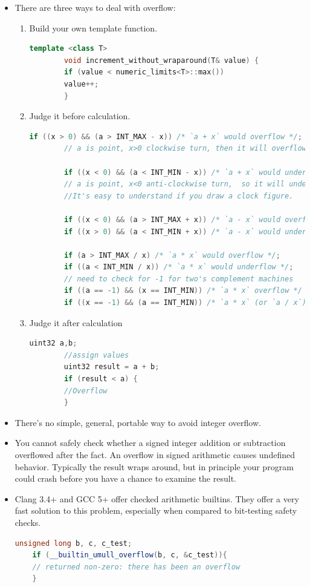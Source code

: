 \documentclass[a4paper,11pt,twoside]{book}
\begin{document}
\begin{itemize}
	\item There are three ways to deal with overflow:
	\begin{enumerate}
		\item Build your own template function.
		\begin{lstlisting}[frame=single, language=c++]
		template <class T>
		void increment_without_wraparound(T& value) {
		if (value < numeric_limits<T>::max())
		value++;
		}
		\end{lstlisting}
		
		\item  Judge it before calculation.
		\begin{lstlisting}[frame=single, language=c++]
		if ((x > 0) && (a > INT_MAX - x)) /* `a + x` would overflow */;
		// a is point, x>0 clockwise turn, then it will overflow
		
		if ((x < 0) && (a < INT_MIN - x)) /* `a + x` would underflow */;
		// a is point, x<0 anti-clockwise turn,  so it will underflow
		//It's easy to understand if you draw a clock figure.
		
		if ((x < 0) && (a > INT_MAX + x)) /* `a - x` would overflow */;
		if ((x > 0) && (a < INT_MIN + x)) /* `a - x` would underflow */;
		
		if (a > INT_MAX / x) /* `a * x` would overflow */;
		if ((a < INT_MIN / x)) /* `a * x` would underflow */;
		// need to check for -1 for two's complement machines
		if ((a == -1) && (x == INT_MIN)) /* `a * x` overflow */
		if ((x == -1) && (a == INT_MIN)) /* `a * x` (or `a / x`) overflow */
		\end{lstlisting}
		
		\item Judge it after calculation
		\begin{lstlisting}[frame=single, language=c++]
		uint32 a,b;
		//assign values
		uint32 result = a + b;
		if (result < a) {
		//Overflow
		}
		\end{lstlisting}
	\end{enumerate}
	
	
	\item There's no simple, general, portable way to avoid integer overflow.
	\item You cannot safely check whether a signed integer addition or subtraction overflowed after the fact. An overflow in signed arithmetic causes undefined behavior. Typically the result wraps around, but in principle your program could crash before you have a chance to examine the result.
	
	\item Clang 3.4+ and GCC 5+ offer checked arithmetic builtins. They offer a very fast solution to this problem, especially when compared to bit-testing safety checks.
	\begin{lstlisting}[frame=single, language=c++]
	unsigned long b, c, c_test;
	if (__builtin_umull_overflow(b, c, &c_test)){
	// returned non-zero: there has been an overflow
	}
	\end{lstlisting}
	

\end{itemize}
\end{document}
